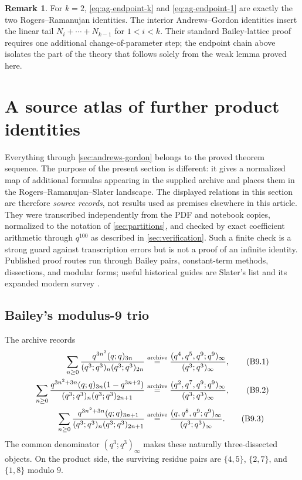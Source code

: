 \documentclass[11pt,oneside]{article}
\theoremstyle{definition}
\newtheorem{remark}[theorem]{Remark}
\begin{document}
\begin{remark}
For $k=2$, \eqref{eq:ag-endpoint-k} and
\eqref{eq:ag-endpoint-1} are exactly the two Rogers--Ramanujan
identities.  The interior Andrews--Gordon identities insert the linear
tail $N_i+\cdots+N_{k-1}$ for $1<i<k$.  Their standard Bailey-lattice
proof requires one additional change-of-parameter step; the endpoint
chain above isolates the part of the theory that follows solely from
the weak lemma proved here.
\end{remark}


\section{A source atlas of further product identities}
\label{sec:atlas}

Everything through \cref{sec:andrews-gordon} belongs to the proved theorem
sequence.  The purpose of the present section is different: it gives a
normalized map of additional formulas appearing in the supplied archive and
places them in the Rogers--Ramanujan--Slater landscape.  The displayed
relations in this section are therefore \emph{source records}, not results used
as premises elsewhere in this article.  They were transcribed independently
from the PDF and notebook copies, normalized to the notation of
\cref{sec:partitions}, and checked by exact coefficient arithmetic through
$q^{100}$ as described in \cref{sec:verification}.  Such a finite check is a
strong guard against transcription errors but is not a proof of an infinite
identity.  Published proof routes run through Bailey pairs, constant-term
methods, dissections, and modular forms; useful historical guides are
Slater's list and its expanded modern survey
\cite{Slater1952,McLaughlinSillsZimmer}.

\subsection{Bailey's modulus-9 trio}

The archive records
\begin{align*}
 \sum_{n\ge0}
 \frac{q^{3n^2}(q;q)_{3n}}
 {(q^3;q^3)_n(q^3;q^3)_{2n}}
 &\mathrel{\stackrel{\rm archive}{=}}
 \frac{(q^4,q^5,q^9;q^9)_\infty}{(q^3;q^3)_\infty},
 \tag{B9.1}\label{eq:atlas-b9-1}\\
 \sum_{n\ge0}
 \frac{q^{3n^2+3n}(q;q)_{3n}(1-q^{3n+2})}
 {(q^3;q^3)_n(q^3;q^3)_{2n+1}}
 &\mathrel{\stackrel{\rm archive}{=}}
 \frac{(q^2,q^7,q^9;q^9)_\infty}{(q^3;q^3)_\infty},
 \tag{B9.2}\label{eq:atlas-b9-2}\\
 \sum_{n\ge0}
 \frac{q^{3n^2+3n}(q;q)_{3n+1}}
 {(q^3;q^3)_n(q^3;q^3)_{2n+1}}
 &\mathrel{\stackrel{\rm archive}{=}}
 \frac{(q,q^8,q^9;q^9)_\infty}{(q^3;q^3)_\infty}.
 \tag{B9.3}\label{eq:atlas-b9-3}
\end{align*}
The common denominator $(q^3;q^3)_\infty$ makes these naturally
three-dissected objects.  On the product side, the surviving residue pairs are
$\{4,5\}$, $\{2,7\}$, and $\{1,8\}$ modulo $9$.
\end{document}
